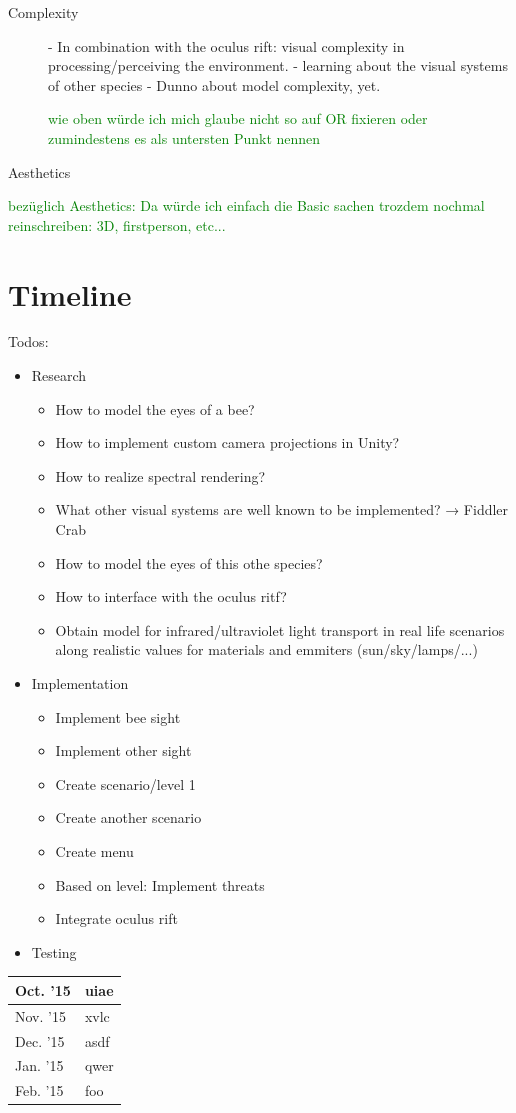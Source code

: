 \documentclass{acm_proc_article-sp}
\newcommand{\sebastian}[1]{\textcolor{Green}{#1}}
\begin{document}
\begin{description}
\item[Complexity]
- In combination with the oculus rift: visual complexity in
  processing/perceiving the environment.
- learning about the visual systems of other species
- Dunno about model complexity, yet.

\sebastian{wie oben würde ich mich glaube nicht so auf OR fixieren oder zumindestens es als untersten Punkt nennen}


\item[Aesthetics]
\end{description}

\sebastian{bezüglich Aesthetics: Da würde ich einfach die Basic sachen trozdem nochmal reinschreiben: 3D, firstperson, etc...}


\section{Timeline}

Todos:
\begin{itemize}
  \item Research
  \begin{itemize}
    \item How to model the eyes of a bee?
    \item How to implement custom camera projections in Unity?
    \item How to realize spectral rendering?
    \item What other visual systems are well known to be implemented? → Fiddler Crab
    \item How to model the eyes of this othe species?
    \item How to interface with the oculus ritf?
    \item Obtain model for infrared/ultraviolet light transport in real life
          scenarios along realistic values for materials and emmiters (sun/sky/lamps/...)
  \end{itemize}
  \item Implementation
  \begin{itemize}
    \item Implement bee sight
    \item Implement other sight
    \item Create scenario/level 1
    \item Create another scenario
    \item Create menu
    \item Based on level: Implement threats
    \item Integrate oculus rift
  \end{itemize}
  \item Testing
\end{itemize}

\begin{center}
  \begin{tabular}{|l|p{6.5cm}|}
    \hline
    Oct. '15 & uiae \\ \hline
    Nov. '15 & xvlc \\ \hline
    Dec. '15 & asdf \\ \hline
    Jan. '15 & qwer \\ \hline
    Feb. '15 & foo \\
    \hline
  \end{tabular}
\end{center}

\printbibliography

\balancecolumns
\end{document}
